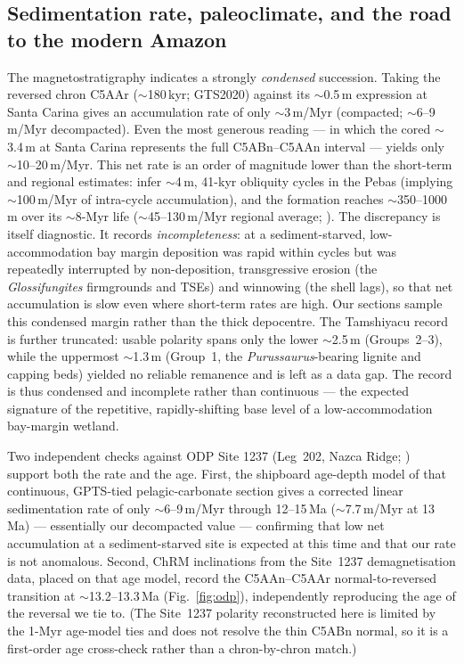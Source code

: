 \documentclass[11pt]{article}
\begin{document}
\subsection{Sedimentation rate, paleoclimate, and the road to the modern Amazon}
The magnetostratigraphy indicates a strongly \emph{condensed} succession. Taking
the reversed chron C5AAr ($\sim$180\,kyr; GTS2020) against its $\sim$0.5\,m
expression at Santa Carina gives an accumulation rate of only
$\sim$3\,m/Myr (compacted; $\sim$6--9\,m/Myr decompacted). Even the most generous
reading --- in which the cored $\sim$3.4\,m at Santa Carina represents the full
C5ABn--C5AAn interval --- yields only $\sim$10--20\,m/Myr. This net rate is an order of magnitude lower than the short-term and regional
estimates: \citet{Hoorn2022} infer $\sim$4\,m, 41-kyr obliquity cycles in the Pebas
(implying $\sim$100\,m/Myr of intra-cycle accumulation), and the formation reaches
$\sim$350--1000\,m over its $\sim$8-Myr life ($\sim$45--130\,m/Myr regional average;
\citealp{Hoorn2010}). The discrepancy is itself diagnostic. It records
\emph{incompleteness}: at a sediment-starved, low-accommodation bay margin
\citep{Gingras2002} deposition was rapid within cycles but was repeatedly
interrupted by non-deposition, transgressive erosion (the \textit{Glossifungites}
firmgrounds and TSEs) and winnowing (the shell lags), so that net accumulation is
slow even where short-term rates are high. Our sections sample this condensed
margin rather than the thick depocentre. The Tamshiyacu record is further
truncated: usable polarity spans only the lower $\sim$2.5\,m (Groups~2--3), while
the uppermost $\sim$1.3\,m (Group~1, the \textit{Purussaurus}-bearing lignite and
capping beds) yielded no reliable remanence and is left as a data gap. The record
is thus condensed and incomplete rather than continuous --- the expected signature
of the repetitive, rapidly-shifting base level of a low-accommodation bay-margin
wetland.

Two independent checks against ODP Site 1237 (Leg~202, Nazca Ridge;
\citealp{Mix2003}) support both the rate and the age. First, the shipboard
age-depth model of that continuous, GPTS-tied pelagic-carbonate section gives a
corrected linear sedimentation rate of only $\sim$6--9\,m/Myr through 12--15\,Ma
($\sim$7.7\,m/Myr at 13\,Ma) --- essentially our decompacted value --- confirming
that low net accumulation at a sediment-starved site is expected at this time and
that our rate is not anomalous. Second, ChRM inclinations from the Site~1237
demagnetisation data, placed on that age model, record the C5AAn--C5AAr
normal-to-reversed transition at $\sim$13.2--13.3\,Ma (Fig.~\ref{fig:odp}),
independently reproducing the age of the reversal we tie to. (The Site~1237
polarity reconstructed here is limited by the 1-Myr age-model ties and does not
resolve the thin C5ABn normal, so it is a first-order age cross-check rather than a
chron-by-chron match.)
\end{document}
